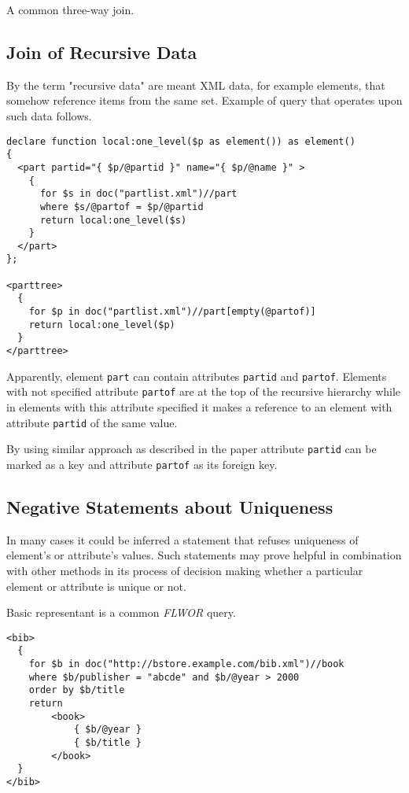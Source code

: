 A common three-way join.

\subsection{Join of Recursive Data}
By the term "recursive data" are meant XML data, for example elements, that somehow reference items from the same set. Example of query that operates upon such data follows.

\begin{verbatim}
declare function local:one_level($p as element()) as element()
{
  <part partid="{ $p/@partid }" name="{ $p/@name }" >
    {
      for $s in doc("partlist.xml")//part
      where $s/@partof = $p/@partid
      return local:one_level($s)
    }
  </part>
};

<parttree>
  {
    for $p in doc("partlist.xml")//part[empty(@partof)]
    return local:one_level($p)
  }
</parttree>
\end{verbatim}

Apparently, element \texttt{part} can contain attributes \texttt{partid} and \texttt{partof}. Elements with not specified attribute \texttt{partof} are at the top of the recursive hierarchy while in elements with this attribute specified it makes a reference to an element with attribute \texttt{partid} of the same value.

By using similar approach as described in the paper  attribute \texttt{partid} can be marked as a key and attribute \texttt{partof} as its foreign key.

\subsection{Negative Statements about Uniqueness}
In many cases it could be inferred a statement that refuses uniqueness of element's or attribute's values. Such statements may prove helpful in combination with other methods in its process of decision making whether a particular element or attribute is unique or not.

Basic representant is a common \emph{FLWOR} query.

\begin{verbatim}
<bib>
  {
    for $b in doc("http://bstore.example.com/bib.xml")//book
    where $b/publisher = "abcde" and $b/@year > 2000
    order by $b/title
    return
        <book>
            { $b/@year }
            { $b/title }
        </book>
  }
</bib>
\end{verbatim}

